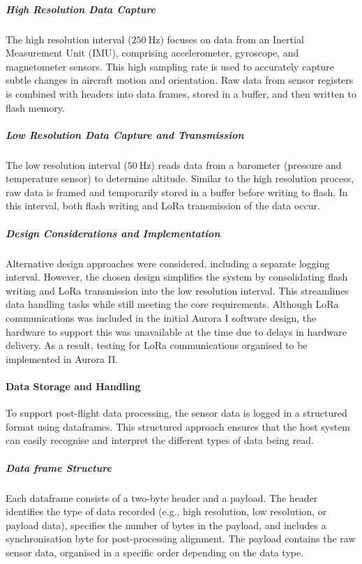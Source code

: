 \subparagraph{High Resolution Data Capture}

The high resolution interval ($\SI{250}{\hertz}$) focuses on data from an Inertial Measurement Unit (IMU), comprising accelerometer, gyroscope, and magnetometer sensors. This high sampling rate is used to accurately capture subtle changes in aircraft motion and orientation. Raw data from sensor registers is combined with headers into data frames, stored in a buffer, and then written to flash memory. 

\subparagraph{Low Resolution Data Capture and Transmission}

The low resolution interval ($\SI{50}{\hertz}$) reads data from a barometer (pressure and temperature sensor) to determine altitude. Similar to the high resolution process, raw data is framed and temporarily stored in a buffer before writing to flash. In this interval, both flash writing and LoRa transmission of the data occur. 

\subparagraph{Design Considerations and Implementation}

Alternative design approaches were considered, including a separate logging interval. However, the chosen design simplifies the system by consolidating flash writing and LoRa transmission into the low resolution interval. This streamlines data handling tasks while still meeting the core requirements. Although LoRa communications was included in the initial Aurora I software design, the hardware to support this was unavailable at the time due to delays in hardware delivery. As a result, testing for LoRa communications organised to be implemented in Aurora II.  

\paragraph{Data Storage and Handling}

To support post-flight data processing, the sensor data is logged in a structured format using dataframes. This structured approach ensures that the host system can easily recognise and interpret the different types of data being read. 

\subparagraph{Data frame Structure}\label{sec:dataframe}

Each dataframe consists of a two-byte header and a payload. The header identifies the type of data recorded (e.g., high resolution, low resolution, or payload data), specifies the number of bytes in the payload, and includes a synchronisation byte for post-processing alignment. The payload contains the raw sensor data, organised in a specific order depending on the data type.  

